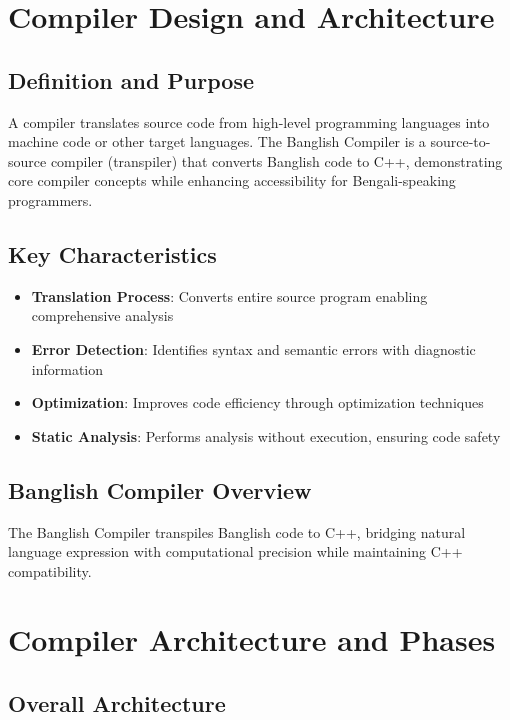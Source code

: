 \documentclass[12pt,a4paper]{article}
\begin{document}
\section{Compiler Design and Architecture}

\subsection{Definition and Purpose}

A compiler translates source code from high-level programming languages into machine code or other target languages. The Banglish Compiler is a source-to-source compiler (transpiler) that converts Banglish code to C++, demonstrating core compiler concepts while enhancing accessibility for Bengali-speaking programmers.

\subsection{Key Characteristics}

\begin{itemize}[leftmargin=*,itemsep=3pt]
    \item \textbf{Translation Process}: Converts entire source program enabling comprehensive analysis
    \item \textbf{Error Detection}: Identifies syntax and semantic errors with diagnostic information
    \item \textbf{Optimization}: Improves code efficiency through optimization techniques
    \item \textbf{Static Analysis}: Performs analysis without execution, ensuring code safety
\end{itemize}

\subsection{Banglish Compiler Overview}

The Banglish Compiler transpiles Banglish code to C++, bridging natural language expression with computational precision while maintaining C++ compatibility.

\section{Compiler Architecture and Phases}

\subsection{Overall Architecture}
\end{document}

